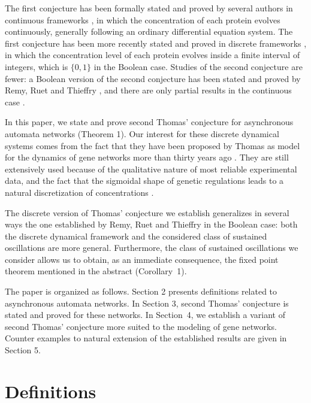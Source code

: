 \documentclass[11pt]{article}
\begin{document}
The first conjecture has been formally stated and proved by several
authors in continuous frameworks {\cite{PM95,G98,S98,CD02,S03,S06}},
in which the concentration of each protein evolves continuously,
generally following an ordinary differential equation system. The
first conjecture has been more recently stated and proved in discrete
frameworks {\cite{ADG04,A08,RC07,RR08,R09}}, in which the
concentration level of each protein evolves inside a
finite interval of integers, which is $\{0,1\}$ in the Boolean
case. Studies of the second conjecture are fewer: a Boolean version of
the second conjecture has been stated and proved by Remy, Ruet and
Thieffry {\cite{RR08}}, and there are only partial results in the
continuous case {\cite{G98,S98}}.

In this paper, we state and prove second Thomas' conjecture for
asynchronous automata networks (Theorem 1). Our interest for these
discrete dynamical systems comes from the fact that they have been
proposed by Thomas as model for the dynamics of gene networks more
than thirty years ago {\cite{T73,TA90,T91,TK01}}. They are still
extensively used because of the qualitative nature of most reliable
experimental data, and the fact that the sigmoidal shape of genetic
regulations leads to a natural discretization of concentrations
{\cite{GK73,S89,TA90,ST93,dJ04}}.

The discrete version of Thomas' conjecture we establish generalizes in
several ways the one established by Remy, Ruet and Thieffry
{\cite{RR08}} in the Boolean case: both the discrete dynamical
framework and the considered class of sustained oscillations are more
general. Furthermore, the class of sustained oscillations we consider
allows us to obtain, as an immediate consequence, the fixed point
theorem mentioned in the abstract (Corollary~1).

The paper is organized as follows. Section 2 presents definitions
related to asynchronous automata networks. In Section 3, second
Thomas' conjecture is stated and proved for these networks. In
Section~4, we establish a variant of second Thomas' conjecture 
more suited to the modeling of gene networks. Counter examples to
natural extension of the established results are given in Section 5.

\section{Definitions}
\end{document}

